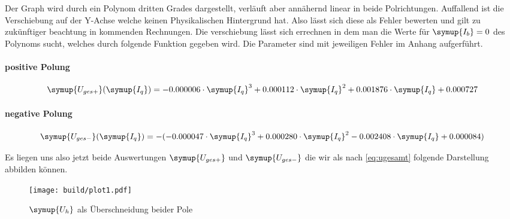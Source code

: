 Der Graph wird durch ein Polynom dritten Grades dargestellt, verläuft aber annähernd linear in beide Polrichtungen. Auffallend ist die Verschiebung auf der Y-Achse %
welche keinen Physikalischen Hintergrund hat. Also lässt sich diese als Fehler bewerten und gilt zu zukünftiger beachtung in kommenden Rechnungen.
Die verschiebung lässt sich errechnen in dem man die Werte für $\symup{I_b}=0$ des Polynoms sucht, welches durch folgende Funktion gegeben wird.  
Die Parameter sind mit jeweiligen Fehler im Anhang aufgerführt.  

\paragraph{positive Polung}
\begin{equation}
   \symup{U_{ges+}}(\symup{I_q})=-0.000006 \cdot \symup{I_q}^3 + 0.000112\cdot\symup{I_q}^2 + 0.001876 \cdot\symup{I_q} + 0.000727 
\end{equation}

\paragraph{negative Polung} 
\begin{equation}
   \symup{U_{ges-}}(\symup{I_q})=-(-0.000047 \cdot \symup{I_q}^3 + 0.000280\cdot\symup{I_q}^2 -0.002408\cdot\symup{I_q} + 0.000084)
\end{equation}

%
%

Es liegen uns also jetzt beide Auswertungen $\symup{U_{ges+}}$ und $\symup{U_{ges-}}$ die wir als nach \eqref{eq:ugesamt} folgende Darstellung abbilden können.

\begin{figure}[h]
   \centering
   \texttt{[image: build/plot1.pdf]} %
   \caption{$\symup{U_h}$ als Überschneidung beider Pole}
   \label{fig:auswertunghall}
\end{figure}

